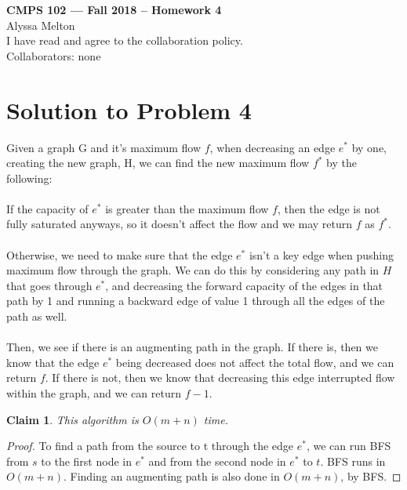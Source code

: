 \documentclass[11pt]{article}
\newtheorem{claim}[theorem]{Claim}
\begin{document}
	\begin{center}
		{\bf\Large CMPS 102 --- Fall 2018 --  Homework 4}\\
		Alyssa Melton\\
		I have read and agree to the collaboration policy. \\
		Collaborators: none\\
	\end{center}


	\section*{Solution to Problem 4}
		Given a graph G and it's maximum flow $f$, when decreasing an edge $e^*$ by one, creating the new graph, H, we can find the new maximum flow $f^*$ by the following:\\
		\\
		If the capacity of $e^*$ is greater than the maximum flow $f$, then the edge is not fully saturated anyways, so it doesn't affect the flow and we may return $f$ as $f^*$.\\
		\\
		Otherwise, we need to make sure that the edge $e^*$ isn't a key edge when pushing maximum flow through the graph. We can do this by considering any path in $H$ that goes through $e^*$, and decreasing the forward capacity of the edges in that path by 1 and running a backward edge of value 1 through all the edges of the path as well. \\
		\\
		Then, we see if there is an augmenting path in the graph.
		If there is, then we know that the edge $e^*$ being decreased does not affect the total flow, and we can return $f$.
		If there is not, then we know that decreasing this edge interrupted flow within the graph, and we can return $f-1$.

	\begin{claim}
		This algorithm is $O(m+n)$ time.
	\end{claim}

	\begin{proof}
		To find a path from the source to t through the edge $e^*$, we can run BFS from $s$ to the first node in $e^*$ and from the second node in $e^*$ to $t$. BFS runs in $O(m+n)$. Finding an augmenting path is also done in $O(m+n)$, by BFS.
	\end{proof}
\end{document}
